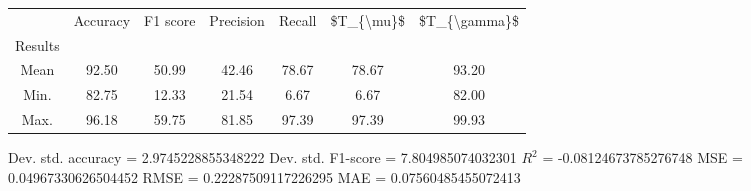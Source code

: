 \begin{tabular}{|c|c|c|c|c|c|c|}
\toprule
{} &  Accuracy &  F1 score &  Precision &  Recall &  \$T\_\{\textbackslash mu\}\$ &  \$T\_\{\textbackslash gamma\}\$ \\
Results &           &           &            &         &            &               \\
\hline
Mean    &     92.50 &     50.99 &      42.46 &   78.67 &      78.67 &         93.20 \\
Min.    &     82.75 &     12.33 &      21.54 &    6.67 &       6.67 &         82.00 \\
Max.    &     96.18 &     59.75 &      81.85 &   97.39 &      97.39 &         99.93 \\
\bottomrule
\end{tabular}

 Dev. std. accuracy = 2.9745228855348222
 Dev. std. F1-score = 7.804985074032301
 $R^2$ = -0.08124673785276748
 MSE = 0.04967330626504452
 RMSE = 0.22287509117226295
 MAE = 0.07560485455072413